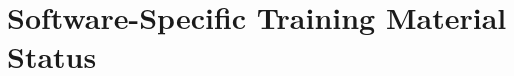 \section{Software-Specific Training Material Status}
\label{sec:software:training}


%






%
%



%
%
%